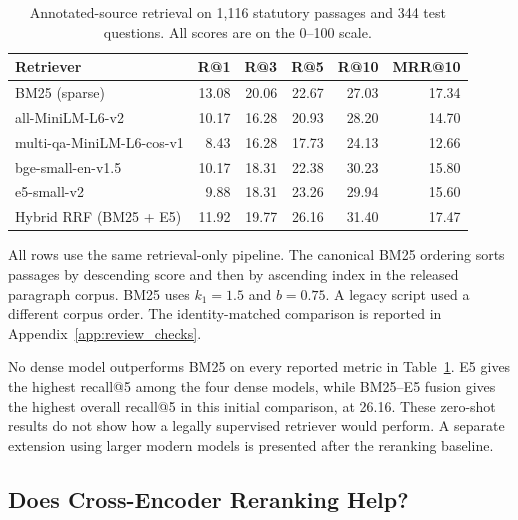 \documentclass[pdflatex,sn-basic]{sn-jnl}%
\theoremstyle{thmstyleone}%
\theoremstyle{thmstyletwo}%
\theoremstyle{thmstylethree}%
\begin{document}
\begin{table}[!htbp]
    \caption{Annotated-source retrieval on 1,116 statutory passages and 344
    test questions. All scores are on the 0--100 scale.}
    \label{tab:dense_retrieval}
    \centering
    \scriptsize
    \setlength{\tabcolsep}{3pt}
    \begin{tabular}{@{}lrrrrr@{}}
        \toprule
        Retriever & R@1 & R@3 & R@5 & R@10 & MRR@10 \\
        \midrule
        BM25 (sparse)                & 13.08 & 20.06 & 22.67 & 27.03 & 17.34 \\
        \midrule
        all-MiniLM-L6-v2             & 10.17 & 16.28 & 20.93 & 28.20 & 14.70 \\
        multi-qa-MiniLM-L6-cos-v1    &  8.43 & 16.28 & 17.73 & 24.13 & 12.66 \\
        bge-small-en-v1.5            & 10.17 & 18.31 & 22.38 & 30.23 & 15.80 \\
        e5-small-v2                  &  9.88 & 18.31 & 23.26 & 29.94 & 15.60 \\
        \midrule
        Hybrid RRF (BM25 + E5)       & 11.92 & 19.77 & 26.16 & 31.40 & 17.47 \\
        \bottomrule
    \end{tabular}
    \begin{flushleft}
        {\scriptsize All rows use the same retrieval-only pipeline. The
        canonical BM25 ordering sorts passages by descending score and then
        by ascending index in the released paragraph corpus. BM25 uses
        $k_1{=}1.5$ and $b{=}0.75$. A legacy script used a different corpus
        order. The identity-matched comparison is reported in
        Appendix~\ref{app:review_checks}.}
    \end{flushleft}
\end{table}

No dense model outperforms BM25 on every reported metric in
Table~\ref{tab:dense_retrieval}. E5 gives the highest recall@5 among the four
dense models, while BM25--E5 fusion gives the highest overall recall@5 in this
initial comparison, at 26.16. These zero-shot results do not show how a legally
supervised retriever would perform. A separate extension using larger modern
models is presented after the reranking baseline.

\FloatBarrier

\subsection{Does Cross-Encoder Reranking Help?}
\label{sec:reranking}
\end{document}
